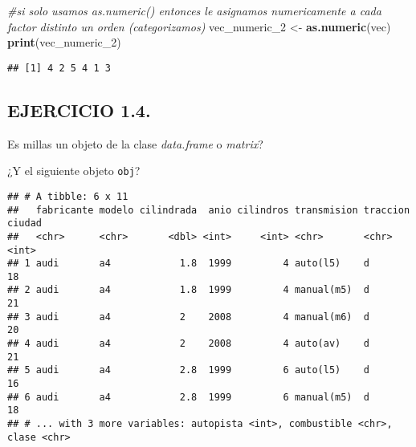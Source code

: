 \documentclass[]{article}
\newenvironment{Shaded}{\begin{snugshade}}{\end{snugshade}}
\newcommand{\CommentTok}[1]{\textcolor[rgb]{0.56,0.35,0.01}{\textit{#1}}}
\newcommand{\DecValTok}[1]{\textcolor[rgb]{0.00,0.00,0.81}{#1}}
\newcommand{\KeywordTok}[1]{\textcolor[rgb]{0.13,0.29,0.53}{\textbf{#1}}}
\newcommand{\NormalTok}[1]{#1}
\newcommand{\OperatorTok}[1]{\textcolor[rgb]{0.81,0.36,0.00}{\textbf{#1}}}
\newcommand{\StringTok}[1]{\textcolor[rgb]{0.31,0.60,0.02}{#1}}
\begin{document}
\begin{Shaded}
\begin{Highlighting}[]
\CommentTok{#si solo usamos as.numeric() entonces le asignamos numericamente a cada factor distinto un orden (categorizamos)}
\NormalTok{vec_numeric_}\DecValTok{2}\NormalTok{ <-}\StringTok{ }\KeywordTok{as.numeric}\NormalTok{(vec)}
\KeywordTok{print}\NormalTok{(vec_numeric_}\DecValTok{2}\NormalTok{)}
\end{Highlighting}
\end{Shaded}

\begin{verbatim}
## [1] 4 2 5 4 1 3
\end{verbatim}

\hypertarget{ejercicio-1.4.}{%
\subsection{EJERCICIO 1.4.}\label{ejercicio-1.4.}}

Es millas un objeto de la clase \emph{data.frame} o \emph{matrix}?

¿Y el siguiente objeto \texttt{obj}?

\begin{Shaded}
\end{Shaded}

\begin{verbatim}
## # A tibble: 6 x 11
##   fabricante modelo cilindrada  anio cilindros transmision traccion ciudad
##   <chr>      <chr>       <dbl> <int>     <int> <chr>       <chr>     <int>
## 1 audi       a4            1.8  1999         4 auto(l5)    d            18
## 2 audi       a4            1.8  1999         4 manual(m5)  d            21
## 3 audi       a4            2    2008         4 manual(m6)  d            20
## 4 audi       a4            2    2008         4 auto(av)    d            21
## 5 audi       a4            2.8  1999         6 auto(l5)    d            16
## 6 audi       a4            2.8  1999         6 manual(m5)  d            18
## # ... with 3 more variables: autopista <int>, combustible <chr>, clase <chr>
\end{verbatim}
\end{document}
